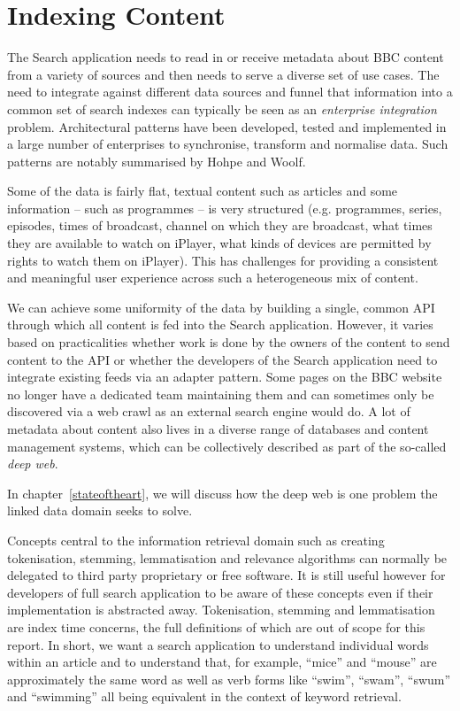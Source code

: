 \documentclass[10pt,a4paper]{report}
\begin{document}
\section{Indexing Content}

The Search application needs to read in or receive metadata about
BBC content from a variety of sources and then needs to serve
a diverse set of use cases. \cite{fenning2014applicability} The
need to integrate against different data sources and funnel
that information into a common set of search indexes can
typically be seen as an \emph{enterprise integration}
problem. Architectural patterns have been developed, tested and
implemented in a large number of enterprises to synchronise,
transform and normalise data. Such patterns are notably
summarised by Hohpe and Woolf\cite{hohpe2004enterprise}.

Some of the data is fairly flat, textual content such as articles and some
information -- such as programmes -- is very structured (e.g. programmes,
series, episodes, times of broadcast, channel on which they are broadcast,
what times they are available to watch on iPlayer, what kinds of devices
are permitted by rights to watch them on iPlayer). This has challenges
for providing a consistent and meaningful user experience across such
a heterogeneous mix of content.

We can achieve some uniformity of the data by building a single, common
API through which all content is fed into the Search application. However,
it varies based on practicalities whether
work is done by the owners of the content to send content to the API
or whether the developers of the Search application need to integrate
existing feeds via an adapter pattern. Some pages on the BBC website no
longer have a dedicated team maintaining them and can sometimes only
be discovered via a web crawl as an external search engine would do. A lot
of metadata about content also lives in a diverse range of databases and
content management systems, which can be collectively described as part
of the so-called \emph{deep web}. \cite{}

In chapter~\ref{stateoftheart}, we will discuss how the deep web is one
problem the linked data domain seeks to solve.

Concepts central to the information retrieval domain such as creating
tokenisation, stemming, lemmatisation and relevance
algorithms can normally be delegated to
third party proprietary or free software. It is still useful however
for developers of full search application to be aware of these concepts even
if their implementation is abstracted away. Tokenisation, stemming and
lemmatisation are index time concerns, the full definitions of which
are out of scope for this report. In short, we want a search application
to understand individual words within an article and to understand that, for
example, ``mice'' and ``mouse'' are approximately the same word as well
as verb forms like ``swim'', ``swam'', ``swum'' and ``swimming'' all being
equivalent in the context of keyword retrieval.
\end{document}
